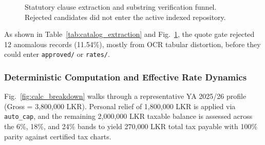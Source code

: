 \documentclass[conference]{IEEEtran}
\begin{document}
\begin{figure}[!htbp]
\centering
{}
\caption{Statutory clause extraction and substring verification funnel. Rejected candidates did not enter the active indexed repository.}
\label{fig:extraction_funnel}
\end{figure}

As shown in Table~\ref{tab:catalog_extraction} and Fig.~\ref{fig:extraction_funnel}, the quote gate rejected 12 anomalous records (11.54\%), mostly from OCR tabular distortion, before they could enter \texttt{approved/} or \texttt{rates/}.

\subsubsection{Deterministic Computation and Effective Rate Dynamics}
Fig.~\ref{fig:calc_breakdown} walks through a representative YA 2025/26 profile (Gross = 3,800,000 LKR). Personal relief of 1,800,000 LKR is applied via \texttt{auto\_cap}, and the remaining 2,000,000 LKR taxable balance is assessed across the 6\%, 18\%, and 24\% bands to yield 270,000 LKR total tax payable with 100\% parity against certified tax charts.
\end{document}
